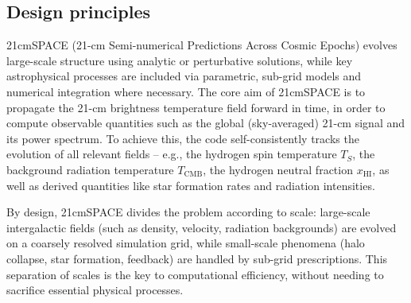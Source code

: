 \documentclass[floats,floatfix,showpacs,amssymb,prd,superscriptaddress,nofootinbib]{revtex4-2} %
\newcommand{\red}{\textcolor{red}}
\begin{document}

\subsection{Design principles}
21cmSPACE (21-cm Semi-numerical Predictions Across Cosmic Epochs) evolves large-scale structure using analytic or perturbative solutions, while key astrophysical processes are included via parametric, sub-grid models and numerical integration where necessary. The core aim of 21cmSPACE is to propagate the 21-cm brightness temperature field forward in time, in order to compute observable quantities such as the global (sky-averaged) 21-cm signal and its power spectrum. To achieve this, the code self-consistently tracks the evolution of all relevant fields -- e.g., the hydrogen spin temperature $T_S$, the background radiation temperature $T_{\text{CMB}}$, the hydrogen neutral fraction $x_{\text{HI}}$, as well as derived quantities like star formation rates and radiation intensities.

By design, 21cmSPACE divides the problem according to scale: large-scale intergalactic fields (such as density, velocity, radiation backgrounds) are evolved on a coarsely resolved simulation grid, while small-scale phenomena (halo collapse, star formation, feedback) are handled by sub-grid prescriptions. 
This separation of scales is the key to computational efficiency, without needing to sacrifice essential physical processes.
\end{document}
